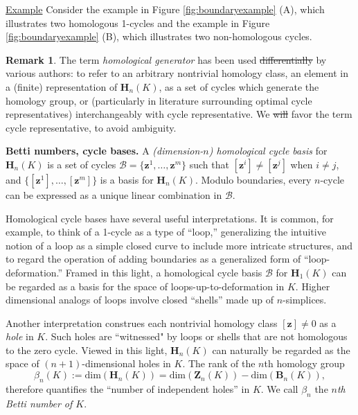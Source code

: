 \documentclass[utf8]{formatting_stuff/frontiersFPHY}
\newcommand{\Homologies}[0]{\mathbf{H}}
\newcommand{\Boundaries}[0]{\mathbf{B}}
\newcommand{\Cycles}[0]{\mathbf{Z}}
\newcommand{\cycle}{{\mathbf z}}
\newcommand{\hcyclebasis}{\mathcal B}
\theoremstyle{plain}
\theoremstyle{definition}
\newtheorem{remark}[theorem]{Remark}
\providecommand{\DIFaddtex}[1]{{\protect\color{blue}\uwave{#1}}}
\providecommand{\DIFdeltex}[1]{{\protect\color{red}\sout{#1}}}
\providecommand{\DIFaddbegin}{} %
\providecommand{\DIFaddend}{} %
\providecommand{\DIFdelbegin}{} %
\providecommand{\DIFdelend}{} %
\providecommand{\DIFadd}[1]{\texorpdfstring{\DIFaddtex{#1}}{#1}} %
\providecommand{\DIFdel}[1]{\texorpdfstring{\DIFdeltex{#1}}{}} %
\begin{document}
\noindent \underline{Example} Consider the example in Figure \ref{fig:boundaryexample} (A), which illustrates two homologous 1-cycles and the example in Figure \ref{fig:boundaryexample} (B), which illustrates two non-homologous cycles. 


\begin{remark}
The term \emph{homological generator} has been used \DIFdelbegin \DIFdel{differentially }\DIFdelend \DIFaddbegin \DIFadd{differently }\DIFaddend by various authors: to refer to an arbitrary nontrivial homology class, an element in a (finite) representation of $\Homologies_n(K)$, as a set of cycles which generate the homology group, or (particularly in literature surrounding optimal cycle representatives)  interchangeably with cycle representative. We \DIFdelbegin \DIFdel{will  }\DIFdelend favor the term cycle representative, to avoid ambiguity.
\end{remark}




\noindent \textbf{Betti numbers, cycle bases.}  A \emph{(dimension-$n$) homological cycle basis} for $\Homologies_n(K)$ is a set of cycles $\hcyclebasis = \{ \cycle^1 , \ldots, \cycle^m\}$ such that $[\cycle^i] \neq [\cycle^j]$ when $i \neq j$, and $\{ [\cycle^1] , \ldots, [\cycle^m]\}$ is a  basis for $\Homologies_n(K)$.  Modulo boundaries, every $n$-cycle can be expressed as a unique linear combination in $\hcyclebasis$.  

Homological cycle bases have several useful interpretations.  It is common, for example, to think of a 1-cycle as a type of ``loop,'' generalizing the intuitive notion of a loop as a simple closed curve to include more intricate structures, and to regard the operation of adding boundaries as a generalized form of ``loop-deformation.''  Framed in this light, a homological cycle basis $\hcyclebasis$ for $\Homologies_1(K)$ can be regarded as a basis for the space of loops-up-to-deformation in $K$. Higher dimensional analogs of loops involve closed ``shells'' made up of $n$-simplices.

Another interpretation construes each nontrivial homology class $[\cycle] \neq 0$ as a \emph{hole} in $K$. Such holes are ``witnessed" by loops or shells that are not homologous to the zero cycle. Viewed in this light, $\Homologies_n(K)$ can naturally be regarded as the space of $(n+1)$-dimensional holes in $K$.  The rank of the $n$th homology group
    \[
    \beta_n(K) := \text{dim}(\Homologies_n(K)) = \text{dim}(\Cycles_n(K)) - \text{dim}(\Boundaries_n(K)),
    \]
therefore quantifies the ``number of independent holes'' in $K$.  We call $\beta_n$ the \emph{$n$th Betti number of $K$}.  
\end{document}
